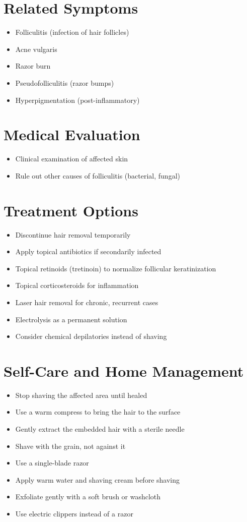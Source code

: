\section*{Related Symptoms}
\begin{itemize}
\item Folliculitis (infection of hair follicles)
\item Acne vulgaris
\item Razor burn
\item Pseudofolliculitis (razor bumps)
\item Hyperpigmentation (post-inflammatory)
\end{itemize}

\section*{Medical Evaluation}
\begin{itemize}
\item Clinical examination of affected skin
\item Rule out other causes of folliculitis (bacterial, fungal)
\end{itemize}

\section*{Treatment Options}
\begin{itemize}
\item Discontinue hair removal temporarily
\item Apply topical antibiotics if secondarily infected
\item Topical retinoids (tretinoin) to normalize follicular keratinization
\item Topical corticosteroids for inflammation
\item Laser hair removal for chronic, recurrent cases
\item Electrolysis as a permanent solution
\item Consider chemical depilatories instead of shaving
\end{itemize}

\section*{Self-Care and Home Management}
\begin{itemize}
\item Stop shaving the affected area until healed
\item Use a warm compress to bring the hair to the surface
\item Gently extract the embedded hair with a sterile needle
\item Shave with the grain, not against it
\item Use a single-blade razor
\item Apply warm water and shaving cream before shaving
\item Exfoliate gently with a soft brush or washcloth
\item Use electric clippers instead of a razor
\end{itemize}

